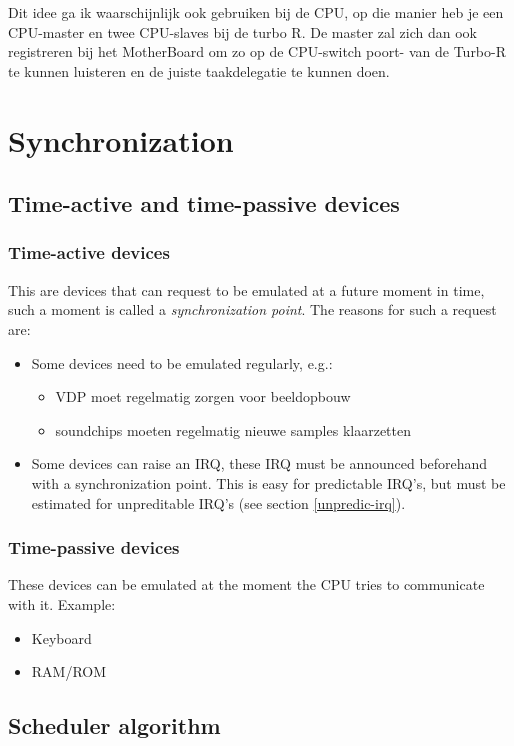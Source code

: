 \documentclass[11pt, a4paper]{report}
\begin{document}
Dit idee ga ik waarschijnlijk ook gebruiken bij de CPU, op die manier heb je een 
CPU-master en twee CPU-slaves bij de turbo R. De master zal zich dan ook registreren 
bij het MotherBoard om zo op de CPU-switch poort- van de Turbo-R te kunnen luisteren 
en de juiste taakdelegatie te kunnen doen.



\section{Synchronization}

\subsection{Time-active and time-passive devices}

\subsubsection{Time-active devices}
This are devices that can request to be emulated at a future moment in time,
such a moment is called a \emph{synchronization point}. The reasons for such a request
are:
\begin{itemize}
\item Some devices need to be emulated regularly, e.g.:
	\begin{itemize}
	\item VDP moet regelmatig zorgen voor beeldopbouw 
	\item soundchips moeten regelmatig nieuwe samples klaarzetten
	\end{itemize}
\item Some devices can raise an IRQ, these IRQ must be announced beforehand
with a synchronization point. This is easy for predictable IRQ's, but must be
estimated for unpreditable IRQ's (see section \ref{unpredic-irq}).
\end{itemize}

\subsubsection{Time-passive devices}
These devices can be emulated at the moment the CPU tries to communicate with
it. Example: 
\begin{itemize}
\item Keyboard
\item RAM/ROM
\end{itemize}


\subsection{Scheduler algorithm}
\end{document}
